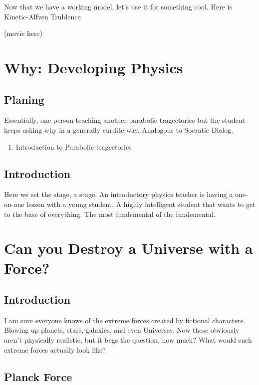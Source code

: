Now that we have a working model, let's use it for something cool. Here is Kinetic-Alfven Trublence

(movie here)



\section{Why: Developing Physics}


\subsection{Planing}

Essentially, one person teaching another parabolic tragectories but the student keeps asking why in a generally eurdite way. Analogous to Socratic Dialog.
\begin{enumerate}
	\item Introduction to Parabolic tragectories
\end{enumerate}


\subsection{Introduction}

Here we set the stage, a stage. An introductory physics teacher is having a one-on-one lesson with a young student. A highly intelligent student that wants to get to the base of everything. The most fundemental of the fundemental.


\section{Can you Destroy a Universe with a Force?}

\subsection{Introduction}

I am sure everyone knows of the extreme forces created by fictional characters. Blowing up planets, stars, galaxies, and even Universes. Now these obviously aren't physically realistic, but it begs the question, how much? What would such extreme forces actually look like?

\subsection{Planck Force}

